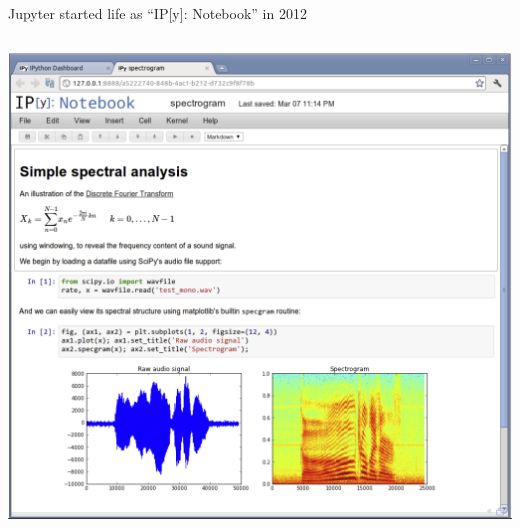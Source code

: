 \documentclass[aspectratio=169]{beamer}
\begin{document}
\begin{frame}{Jupyter started life as ``IP[y]: Notebook'' in 2012}
\vspace{0.2 cm}
\begin{columns}
\includegraphics[width=\linewidth]{../img/screenshot-2012-ipython-notebook.png}
\end{columns}
\end{frame}
\end{document}
